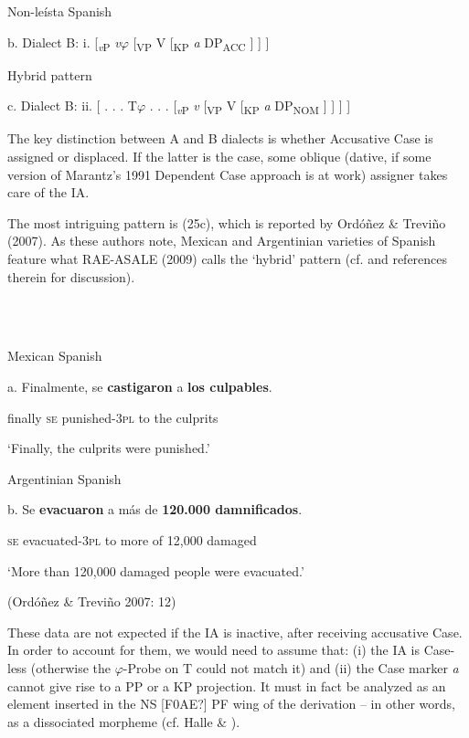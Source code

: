 \documentclass[output=paper]{langsci/langscibook}
\begin{document}
Non-leísta Spanish

b.  Dialect B:  i.  [\textit{\textsubscript{v}}\textsubscript{P} \textit{v}$\varphi $ [\textsubscript{VP} V [\textsubscript{KP} \textit{a} DP\textsubscript{ACC} ] ] ]

 

Hybrid pattern

  c.  Dialect B:  ii.   [ . . . T$\varphi $ . . . [\textit{\textsubscript{v}}\textsubscript{P} \textit{v} [\textsubscript{VP} V [\textsubscript{KP} \textit{a} DP\textsubscript{NOM} ] ] ] ]

 

The key distinction between A and B dialects is whether Accusative Case is assigned or displaced. If the latter is the case, some oblique (dative, if some version of Marantz’s 1991 Dependent Case approach is at work) assigner takes care of the IA.

The most intriguing pattern is (25c), which is reported by Ordóñez \& Treviño (2007). As these authors note, Mexican and Argentinian varieties of Spanish feature what RAE-ASALE (2009) calls the ‘hybrid’ pattern (cf. \citealt{Planells2017} and references therein for discussion).

\ea%
    \label{ex:key:26}
    \gll\\
        \\
    \glt
    \z

          Mexican Spanish

a.   Finalmente, se  \textbf{castigaron}       a  \textbf{los culpables}.        

      finally         \textsc{se}   punished-\textsc{3pl}   to the culprits

‘Finally, the culprits were punished.’

  Argentinian Spanish

b.   Se  \textbf{evacuaron}    a más de \textbf{120.000 damnificados}.              

        \textsc{se}   evacuated-\textsc{3pl} to more of 12,000 damaged

                  ‘More than 120,000 damaged people were evacuated.’

(Ordóñez \& Treviño 2007: 12)

These data are not expected if the IA is inactive, after receiving accusative Case. In order to account for them, we would need to assume that: (i) the IA is Case-less (otherwise the $\varphi $-Probe on T could not match it) and (ii) the Case marker \textit{a} cannot give rise to a PP or a KP projection. It must in fact be analyzed as an element inserted in the NS [F0AE?] PF wing of the derivation – in other words, as a dissociated morpheme (cf. Halle \& \citealt{Marantz1993}).
\end{document}

